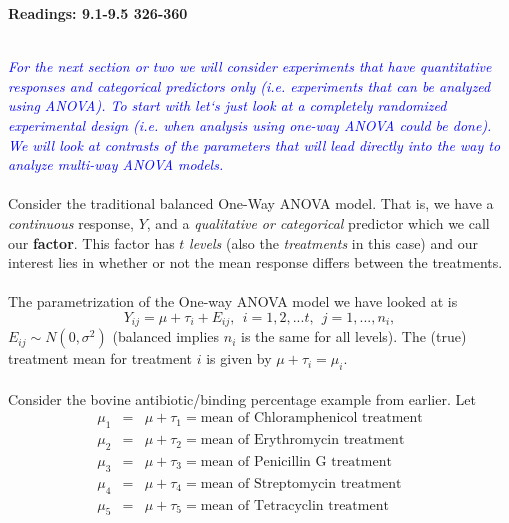 \begin{center}\large\textbf{Readings: 9.1-9.5 326-360}\\
\normalsize \end{center}
\large \hlinewd{2pt}
~\\\textit{\textcolor{blue}{For the next section or two we will consider experiments that have quantitative responses and categorical predictors only (i.e. experiments that can be analyzed using ANOVA).  To start with let`s just look at a completely randomized experimental design (i.e. when analysis using one-way ANOVA could be done).  We will look at contrasts of the parameters that will lead directly into the way to analyze multi-way ANOVA models.}}\\~\\

Consider the traditional balanced One-Way ANOVA model.  That is, we have a \textit{continuous} response, $Y$, and a \textit{qualitative or categorical} predictor which we call our \textbf{factor}.  This factor has $t$ \textit{levels} (also the \textit{treatments} in this case) and our interest lies in whether or not the mean response differs between the treatments.\\~\\
The parametrization of the One-way ANOVA model we have looked at is
$$Y_{ij}=\mu+\tau_{i}+E_{ij},~~i=1,2,...t,~~j=1,...,n_{i},$$
$E_{ij}\sim N(0,\sigma^2)$ (balanced implies $n_{i}$ is the same for all levels).  The (true) treatment mean for treatment $i$ is given by $\mu+\tau_{i}=\mu_{i}$.\\~\\
Consider the bovine antibiotic/binding percentage example from earlier.  Let 
\begin{eqnarray*}
\mu_{1}& = & \mu+\tau_{1} =  \mbox{mean of Chloramphenicol treatment}\\
\mu_{2}& = & \mu+\tau_{2} =  \mbox{mean of Erythromycin treatment}\\
\mu_{3}& = & \mu+\tau_{3} =  \mbox{mean of Penicillin G treatment}\\
\mu_{4}& = & \mu+\tau_{4} =  \mbox{mean of Streptomycin treatment}\\
\mu_{5}& = & \mu+\tau_{5} =  \mbox{mean of Tetracyclin treatment}
\end{eqnarray*}

